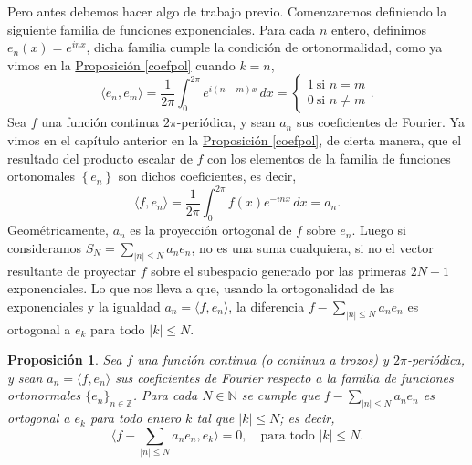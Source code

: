 \documentclass[12pt]{article}
\theoremstyle{plain}
\newtheorem{proposicion}[teorema]{Proposición}
\theoremstyle{definition}
\numberwithin{equation}{section}
\begin{document}
            Pero antes debemos hacer algo de trabajo previo. Comenzaremos definiendo la siguiente familia de funciones exponenciales. Para cada \(n\) entero, definimos \(e_n(x) = e^{inx}\), dicha familia cumple la condición de ortonormalidad, como ya vimos en la \hyperref[coefpol]{Proposición \ref*{coefpol}} cuando \(k = n\),
            \begin{equation*}
                \langle e_n, e_m \rangle = \frac{1}{2\pi} \int_{0}^{2\pi} e^{i(n-m)x}  \,dx = \begin{cases}
                    1\ \text{si \(n = m\)}\\
                    0\ \text{si \(n \neq m\)}
                \end{cases}.
            \end{equation*}
            Sea \(f\) una función continua \(2\pi\)-periódica, y sean \(a_n\) sus coeficientes de Fourier. Ya vimos en el capítulo anterior en la \hyperref[coefpol]{Proposición \ref*{coefpol}}, de cierta manera, que el resultado del producto escalar de \(f\) con los elementos de la familia de funciones ortonomales \(\left\{e_n\right\} \) son dichos coeficientes, es decir,
            \begin{equation*}
                \langle f, e_n \rangle = \frac{1}{2\pi} \int_{0}^{2\pi} f (x)e^{-inx}  \,dx = a_n.
            \end{equation*}
            Geométricamente, \(a_n\) es la proyección ortogonal de \(f\) sobre \(e_n\). Luego si consideramos \(S_N = \sum_{\left\lvert n\right\rvert \leq N } a_n e_n\), no es una suma cualquiera, si no el vector resultante de proyectar \(f\) sobre el subespacio generado por las primeras \(2N+1\) exponenciales. Lo que nos lleva a que, usando la ortogonalidad de las exponenciales y la igualdad \(a_n = \langle f,e_n \rangle\), la diferencia \(f - \sum_{\left\lvert n\right\rvert \leq N } a_n e_n\) es ortogonal a \(e_k\) para todo \(\left\lvert k\right\rvert \leq N\).
            \begin{proposicion}
                Sea \(f\) una función continua (o continua a trozos) y \(2\pi\)-periódica, y sean \(a_n = \langle f, e_n \rangle\) sus coeficientes de Fourier respecto a la familia de funciones ortonormales \(\{e_n\}_{n \in \mathbb{Z}}\). Para cada \(N \in \mathbb{N}\) se cumple que $f - \sum_{\lvert n \rvert \leq N} a_n e_n$ es ortogonal a \(e_k\) para todo entero \(k\) tal que \(\lvert k \rvert \leq N\); es decir,
                \begin{equation*}
                    \langle f - \sum_{\lvert n \rvert \leq N} a_n e_n, e_k \rangle = 0, \quad \text{para todo } \lvert k \rvert \leq N.
                \end{equation*}
            \end{proposicion}
\end{document}
